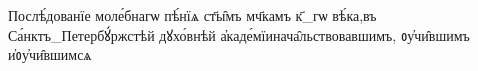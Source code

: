 \documentclass{article}
\begin{document}

Послѣ́дованїе моле́бнагѡ пѣ́нїѧ ст҃ы̑мъ мч҃камъ к҃_гѡ вѣ́ка,въ Са́нктъ_Петербꙋ́ржстѣй дꙋхо́внѣй а҆каде́мїинача̑льствовавшимъ, ᲂу҆чи̑вшимъ и҆ᲂу҆чи̑вшимсѧ
     
     
\end{document}
